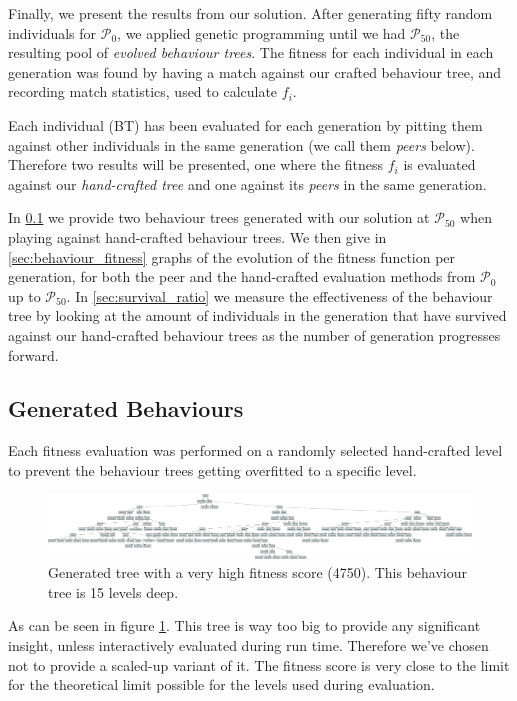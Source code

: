 \documentclass[a4paper, twocolumn]{article}
\begin{document}
        Finally, we present the results from our solution. After generating fifty random individuals for \(\mathcal{P}_0\), we applied genetic programming until we had \(\mathcal{P}_{50}\), the resulting pool of \emph{evolved behaviour trees}. The fitness for each individual in each generation was found by having a match against our crafted behaviour tree, and recording match statistics, used to calculate \(f_i\).

        Each individual (BT) has been evaluated for each generation by pitting them against other individuals in the same generation (we call them \emph{peers} below). Therefore two results will be presented, one where the fitness \(f_i\) is evaluated against our \emph{hand-crafted tree} and one against its \emph{peers} in the same generation.

        In \cref{sec:generated_behaviours} we provide two behaviour trees generated with our solution at \(\mathcal{P}_{50}\) when playing against hand-crafted behaviour trees. We then give in \cref{sec:behaviour_fitness} graphs of the evolution of the fitness function per generation, for both the peer and the hand-crafted evaluation methods from \(\mathcal{P}_0\) up to \(\mathcal{P}_{50}\). In \cref{sec:survival_ratio} we measure the effectiveness of the behaviour tree by looking at the amount of individuals in the generation that have survived against our hand-crafted behaviour trees as the number of generation progresses forward.

        \subsection{Generated Behaviours} \label{sec:generated_behaviours}

        Each fitness evaluation was performed on a randomly selected hand-crafted level to prevent the behaviour trees getting overfitted to a specific level. 

        \begin{figure}[H]
            \centering
            \includegraphics[width=\linewidth]{share/tree-fitness-4750.png}
            \caption{Generated tree with a very high fitness score (4750). This behaviour tree is 15 levels deep.}
            \label{fig:tree_fitness_4075}
        \end{figure}
        As can be seen in figure \ref{fig:tree_fitness_4075}. This tree is way too big to provide any significant insight, unless interactively evaluated during run time. Therefore we've chosen not to provide a scaled-up variant of it. The fitness score is very close to the limit for the theoretical limit possible for the levels used during evaluation.
\end{document}

